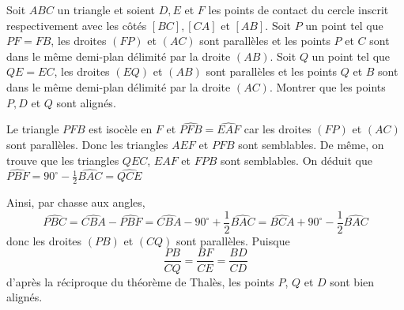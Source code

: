 \begin{exo}
Soit $ABC$ un triangle et soient $D,E$ et $F$ les points de contact du cercle inscrit respectivement avec les côtés $[BC], [CA]$ et $[AB]$. Soit $P$ un point tel que $PF=FB$, les droites $(FP)$ et $(AC)$ sont parallèles et les points $P$ et $C$ sont dans le même demi-plan délimité par la droite $(AB)$. Soit $Q$ un point tel que $QE=EC$, les droites $(EQ)$ et $(AB)$ sont parallèles et les points $Q$ et $B$ sont dans le même demi-plan délimité par la droite $(AC)$. Montrer que les points $P, D$ et $Q$ sont alignés.
\end{exo}

\begin{sol}
\begin{center}
\end{center}

Le triangle $PFB$ est isocèle en $F$ et $\widehat{PFB}=\widehat{EAF}$ car les droites $(FP)$ et $(AC)$ sont parallèles. Donc les triangles $AEF$ et $PFB$ sont semblables. De même, on trouve que les triangles $QEC$, $EAF$ et $FPB$ sont semblables. On déduit que $\widehat{PBF} = 90^\circ - \frac 12\widehat{BAC} = \widehat{QCE}$

Ainsi, par chasse aux angles, $$\widehat{PBC} = \widehat{CBA}-\widehat{PBF}=\widehat{CBA}-90^\circ+\frac 12\widehat{BAC} = \widehat{BCA} + 90^\circ - \frac 12\widehat{BAC}$$
donc les droites $(PB)$ et $(CQ)$ sont parallèles. Puisque
$$\frac{PB}{CQ} = \frac{BF}{CE} = \frac{BD}{CD}$$ d'après la réciproque du théorème de Thalès, les points $P$, $Q$ et $D$ sont bien alignés.
\end{sol}


